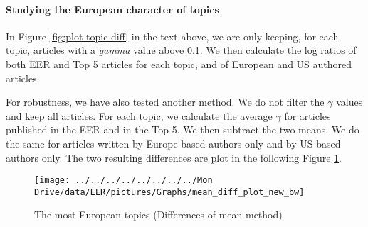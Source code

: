 \documentclass[
  12pt,
  onecolumn]{article}
\begin{document}
\hypertarget{studying-the-european-character-of-topics}{%
\paragraph*{Studying the European character of topics}\label{studying-the-european-character-of-topics}}

In Figure \ref{fig:plot-topic-diff} in the text above, we are only keeping, for each topic, articles with a \emph{gamma} value above 0.1. We then calculate the log ratios of both EER and Top 5 articles for each topic, and of European and US authored articles.

For robustness, we have also tested another method. We do not filter the \(\gamma\) values and keep all articles. For each topic, we calculate the average \(\gamma\) for articles published in the EER and in the Top 5. We then subtract the two means. We do the same for articles written by Europe-based authors only and by US-based authors only. The two resulting differences are plot in the following Figure \ref{fig:plot-topic-diff-alternative}.

\begin{figure}[H]

{\centering \texttt{[image: ../../../../../../../../Mon Drive/data/EER/pictures/Graphs/mean\_diff\_plot\_new\_bw]} 

}

\caption{The most European topics (Differences of mean method)}\label{fig:plot-topic-diff-alternative}
\end{figure}
\end{document}
